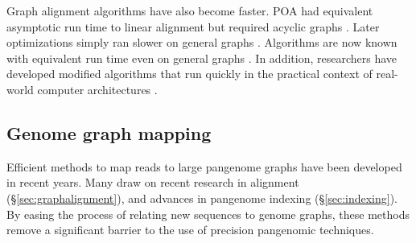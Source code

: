 Graph alignment algorithms have also become faster.
\textsc{POA} had equivalent asymptotic run time to linear alignment but required acyclic graphs \cite{Lee_2002}. 
Later optimizations simply ran slower on general graphs \cite{Kavya_2019}.
Algorithms are now known with equivalent run time even on general graphs \cite{Jain_2019a}.
In addition, researchers have developed modified algorithms that run quickly in the practical context of real-world computer architectures \cite{Suzuki_2018, Rautiainen_2019, Jain_2019b}.


\subsection{Genome graph mapping}
\label{sec:graphmapping}

Efficient methods to map reads to large pangenome graphs have been developed in recent years. %
Many draw on recent research in alignment (\S \ref{sec:graphalignment}), and advances in pangenome indexing (\S \ref{sec:indexing}).
By easing the process of relating new sequences to genome graphs, these methods remove a significant barrier to the use of precision pangenomic techniques.





